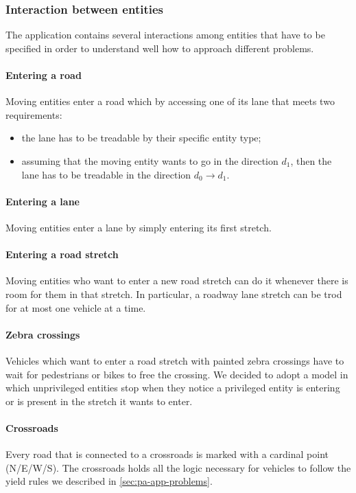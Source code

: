\subsubsection{Interaction between entities}

The application contains several interactions among entities that have to be
specified in order to understand well how to approach different problems.

\paragraph{Entering a road} Moving entities enter a road which by accessing
one of its lane that meets two requirements:

\begin{itemize}
  \item the lane has to be treadable by their specific entity type;
  \item assuming that the moving entity wants to go in the direction $d_1$,
    then the lane has to be treadable in the direction $d_0 \rightarrow d_1$.
\end{itemize}

\paragraph{Entering a lane}
Moving entities enter a lane by simply entering its first stretch.

\paragraph{Entering a road stretch}
Moving entities who want to enter a new road stretch can do it whenever there
is room for them in that stretch.
In particular, a roadway lane stretch can be trod for at most one vehicle at a
time.

\paragraph{Zebra crossings}
Vehicles which want to enter a road stretch with painted zebra crossings have
to wait for pedestrians or bikes to free the crossing.
We decided to adopt a model in which unprivileged entities stop when they
notice a privileged entity is entering or is present in the stretch it wants
to enter.

\paragraph{Crossroads} Every road that is connected to a crossroads is marked
with a cardinal point (N/E/W/S). The crossroads holds all the logic necessary
for vehicles to follow the yield rules we described in
\ref{sec:pa-app-problems}.


